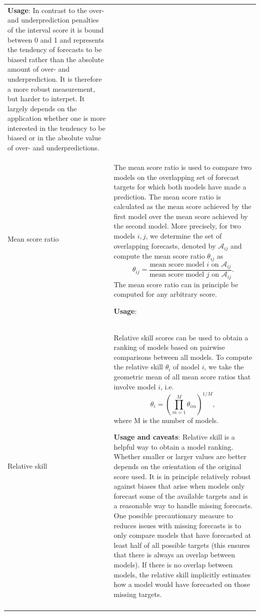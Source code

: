 \documentclass[
]{jss}
\begin{document}
\begin{CodeChunk}
\begin{longtable}[t]{>{\raggedright\arraybackslash}p{1.1in}>{\raggedright\arraybackslash}p{4.625in}}
  \textbf{Usage}:
  In contrast to the over- and underprediction penalties of the interval score it is bound between 0 and 1 and represents the tendency of forecasts to be biased rather than the absolute amount of over- and underprediction. It is therefore a more robust measurement, but harder to interpet. It largely depends on the application whether one is more interested in the tendency to be biased or in the absolute value of over- and underpredictions.\\
\addlinespace
Mean score ratio & The mean score ratio is used to compare two models on the overlapping set of forecast targets for which both models have made a prediction. The mean score ratio is calculated as the mean score achieved by the first model over the mean score achieved by the second model. More precisely, for two models $i, j$, we determine the set of overlapping forecasts, denoted by $\mathcal{A}_{ij}$ and compute the mean score ratio $\theta_{ij}$ as
  $$\theta_{ij} =\frac{\text{mean score model } i \text{ on } \mathcal{A}_{ij}}{\text{mean score model } j \text{ on } \mathcal{A}_{ij}}.$$
  The mean score ratio can in principle be computed for any arbitrary score.

  \textbf{Usage}:
\cellcolor{gray!6}{  Mean scores ratios are usually calculated in the context of pairwise comparisons, where a set of models is compared by looking at mean score ratios of all possible parings. Whether smaller or larger values are better depends on the orientation of the original score used}\\
\addlinespace
Relative skill & Relative skill scores can be used to obtain a ranking of models based on pairwise comparisons between all models. To compute the relative skill $\theta_i$ of model $i$, we take the geometric mean of all mean score ratios that involve model $i$, i.e.
  $$ \theta_{i} = \left(\prod_{m = 1}^M \theta_{im}\right)^{1/M}, $$
  where M is the number of models.

  \textbf{Usage and caveats}:
  Relative skill is a helpful way to obtain a model ranking. Whether smaller or larger values are better depends on the orientation of the original score used.
  It is in principle relatively robust against biases that arise when models only forecast some of the available targets and is a reasonable way to handle missing forecasts. One possible precautionary measure to reduces issues with missing forecasts is to only compare models that have forecasted at least half of all possible targets (this ensures that there is always an overlap between models). If there is no overlap between models, the relative skill implicitly estimates how a model would have forecasted on those missing targets.\\*
\end{longtable}

\end{CodeChunk}

\newpage


\end{document}
